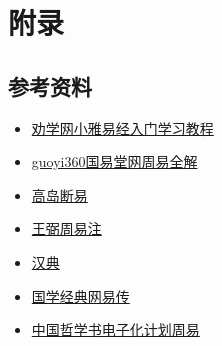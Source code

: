 \documentclass[12pt,oneside]{book}
\begin{document}
\part{附录}
\chapter{参考资料}
\begin{itemize}
\item \href{http://www.quanxue.cn/QT_XiaoYa/YiJingIndex.html}{劝学网小雅易经入门学习教程}
\item \href{http://www.guoyi360.com/zyqs/}{guoyi360国易堂网周易全解}
\item \href{http://www.xshiqi.com/category_zyzs/dgzs/gddy}{高岛断易}
\item \href{http://www.quanxue.cn/QT_MingXiang/ZhouYiZhuIndex.html}{王弼周易注}
\item \href{https://www.zdic.net/}{汉典}
\item \href{http://vsucai.cn/yizhuan/index.html}{国学经典网易传}
\item \href{https://ctext.org/book-of-changes/zhs}{中国哲学书电子化计划周易}
\end{itemize}








\end{document}
